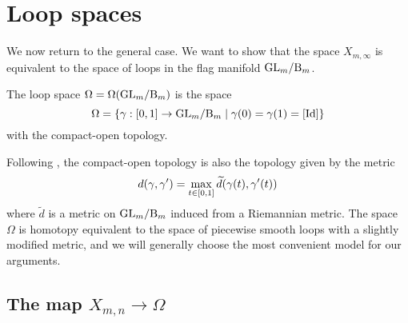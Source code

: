 



\chapter{Loop spaces} 

We now return to the general case. We want to show that the space
$X_{m,\infty}$ is equivalent to the space of loops in the flag
manifold $\mathrm{GL}_{m}/\mathrm{B}_{m}$.

\begin{definition}
  The loop space $\Omega = \Omega(\mathrm{GL}_{m}/\mathrm{B}_{m})$ is the space
  \[ \Omega = \left\{ \gamma : [0,1] \to \mathrm{GL}_{m}/\mathrm{B}_{m} \mid \gamma(0) = \gamma(1) =
    [\operatorname{Id}] \right\} \]
  with the compact-open topology. 
\end{definition}

\begin{remark}
  Following \cite[Chapter 17]{milnor}, the compact-open topology is
  also the topology given by the metric
  \[ d(\gamma,\gamma') = \max_{t\in[0,1]} \widetilde d (\gamma(t),\gamma'(t)) \]
  where $\widetilde d$ is a metric on $\mathrm{GL}_{m}/\mathrm{B}_{m}$ induced from a
  Riemannian metric. The space $\Omega$ is homotopy equivalent to the
  space of piecewise smooth loops with a slightly modified metric, and
  we will generally choose the most convenient model for our
  arguments.
\end{remark}

\section{The map $X_{m,n}\to\Omega$}

